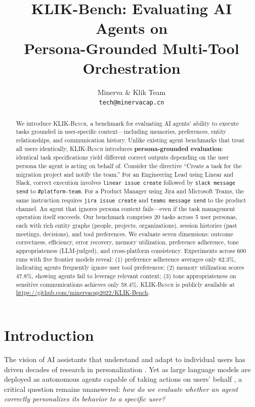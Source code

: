 \documentclass{article}
\title{KLIK-Bench: Evaluating AI Agents on\\Persona-Grounded Multi-Tool Orchestration}
\author{
  Minerva \& Klik Team\\
  \texttt{tech@minervacap.cn}
}
\newcommand{\klikbench}{\textsc{KLIK-Bench}}
\begin{document}
\maketitle

\begin{abstract}
We introduce \klikbench{}, a benchmark for evaluating AI agents' ability to execute tasks grounded in user-specific context---including memories, preferences, entity relationships, and communication history. Unlike existing agent benchmarks that treat all users identically, \klikbench{} introduces \textbf{persona-grounded evaluation}: identical task specifications yield different correct outputs depending on the user persona the agent is acting on behalf of. Consider the directive ``Create a task for the migration project and notify the team.'' For an Engineering Lead using Linear and Slack, correct execution involves \texttt{linear issue create} followed by \texttt{slack message send} to \texttt{\#platform-team}. For a Product Manager using Jira and Microsoft Teams, the same instruction requires \texttt{jira issue create} and \texttt{teams message send} to the product channel. An agent that ignores persona context fails---even if the task management operation itself succeeds. Our benchmark comprises 20 tasks across 5 user personas, each with rich entity graphs (people, projects, organizations), session histories (past meetings, decisions), and tool preferences. We evaluate seven dimensions: outcome correctness, efficiency, error recovery, memory utilization, preference adherence, tone appropriateness (LLM-judged), and cross-platform consistency. Experiments across 600 runs with five frontier models reveal: (1) preference adherence averages only 62.3\%, indicating agents frequently ignore user tool preferences; (2) memory utilization scores 47.8\%, showing agents fail to leverage relevant context; (3) tone appropriateness on sensitive communications achieves only 58.4\%. \klikbench{} is publicly available at \url{https://github.com/minervacap2022/KLIK-Bench}.
\end{abstract}

\section{Introduction}
\label{sec:intro}

The vision of AI assistants that understand and adapt to individual users has driven decades of research in personalization \citep{personalization2020}. Yet as large language models are deployed as autonomous agents capable of taking actions on users' behalf \citep{agentbench2023, webarena2023}, a critical question remains unanswered: \emph{how do we evaluate whether an agent correctly personalizes its behavior to a specific user?}
\end{document}
